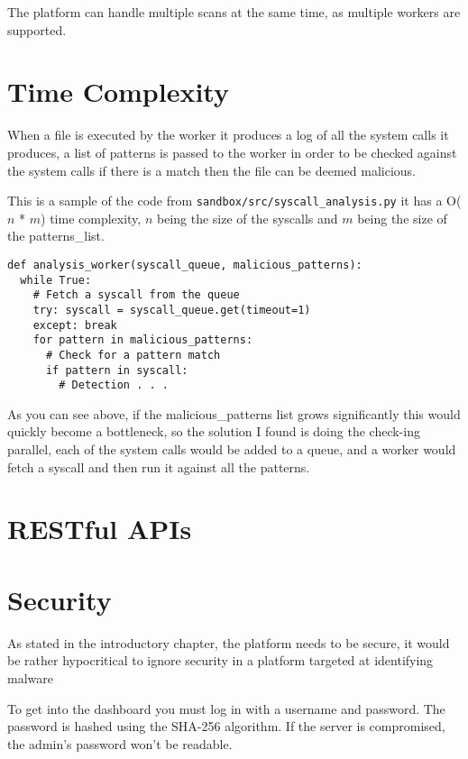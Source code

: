 The platform can handle multiple scans at the same time, as multiple workers are supported.

\section{Time Complexity}
When a file is executed by the worker it produces a log of all the
system calls it produces, a list of patterns is passed to the worker in order to be checked against the system calls if there is a match then the file can be deemed malicious.

This is a sample of the code from \texttt{sandbox/src/syscall\_analysis.py}
it has a O($n$ * $m$) time complexity, $n$ being the size of the syscalls
and $m$ being the size of the patterns\_list.
\begin{lstlisting}
def analysis_worker(syscall_queue, malicious_patterns):
  while True:
    # Fetch a syscall from the queue
    try: syscall = syscall_queue.get(timeout=1)
    except: break
    for pattern in malicious_patterns:
      # Check for a pattern match
      if pattern in syscall:
        # Detection . . .
\end{lstlisting}

As you can see above, if the malicious\_patterns list grows significantly this would quickly become a bottleneck, so the solution I found is doing the check-ing parallel, each of the system calls would be added to a queue, and a worker would fetch a syscall and then run it against all the patterns.


\section{RESTful APIs}


\section{Security}
As stated in the introductory chapter, the platform needs to be secure,
it would be rather hypocritical to ignore security in a platform targeted at identifying malware

To get into the dashboard you must log in with a username and password.
The password is hashed using the SHA-256 algorithm.
If the server is compromised, the admin's password won't be readable.

